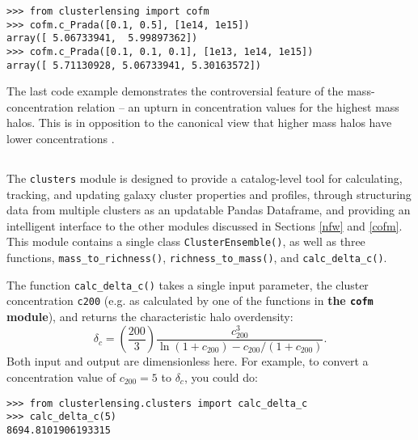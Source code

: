 \documentclass[twocolumn]{aastex6}
\newcommand{\code}{\lstinline[style=codeintext]}
\newcommand{\hcode}{\large\normalfont\texttt} %
\begin{document}
\begin{verbatim}
>>> from clusterlensing import cofm
>>> cofm.c_Prada([0.1, 0.5], [1e14, 1e15])
array([ 5.06733941,  5.99897362])
>>> cofm.c_Prada([0.1, 0.1, 0.1], [1e13, 1e14, 1e15])
array([ 5.71130928, 5.06733941, 5.30163572])
\end{verbatim}
The last code example demonstrates the controversial feature of the \citet{Prada12} mass-concentration relation -- an upturn in concentration values for the highest mass halos. This is in opposition to the canonical view that higher mass halos have lower concentrations \citep{nfw96, nfw97, Jing00, Bullock01}.


\subsection{\normalfont{\hcode{clusters}}}
\label{clusters}
The \code{clusters} module is designed to provide a catalog-level tool for calculating, tracking, and updating galaxy cluster properties and profiles, through structuring data from multiple clusters as an updatable Pandas Dataframe, and providing an intelligent interface to the other modules discussed in Sections \ref{nfw} and \ref{cofm}. This module contains a single class \code{ClusterEnsemble()}, as well as three functions, \code{mass_to_richness()}, \code{richness_to_mass()}, and \code{calc_delta_c()}.

The function \code{calc_delta_c()} takes a single input parameter, the cluster concentration \code{c200} (e.g. as calculated by one of the functions in {\bf the \code{cofm} module}), and returns the characteristic halo overdensity:
\begin{equation}
\delta_c = \left( \frac{200}{3} \right) \frac{c_{200}^3}{\ln(1 + c_{200}) - c_{200}/(1 + c_{200})}.
\end{equation}
Both input and output are dimensionless here. For example, to convert a concentration value of $c_{200} = 5$ to $\delta_c$, you could do:
\begin{verbatim}
>>> from clusterlensing.clusters import calc_delta_c
>>> calc_delta_c(5)
8694.8101906193315
\end{verbatim}
\end{document}
